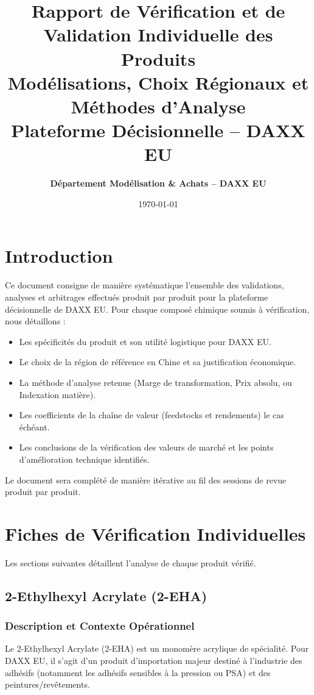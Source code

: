 \documentclass[12pt,a4paper]{article}
\title{\textbf{Rapport de Vérification et de Validation Individuelle des Produits \\ Modélisations, Choix Régionaux et Méthodes d'Analyse \\ Plateforme Décisionnelle -- DAXX EU}}
\author{\textbf{Département Modélisation \& Achats -- DAXX EU}}
\date{\today}
\begin{document}
\maketitle
\tableofcontents
\newpage

\section{Introduction}
Ce document consigne de manière systématique l'ensemble des validations, analyses et arbitrages effectués produit par produit pour la plateforme décisionnelle de DAXX EU. Pour chaque composé chimique soumis à vérification, nous détaillons :
\begin{itemize}
    \item Les spécificités du produit et son utilité logistique pour DAXX EU.
    \item Le choix de la région de référence en Chine et sa justification économique.
    \item La méthode d'analyse retenue (Marge de transformation, Prix absolu, ou Indexation matière).
    \item Les coefficients de la chaîne de valeur (feedstocks et rendements) le cas échéant.
    \item Les conclusions de la vérification des valeurs de marché et les points d'amélioration technique identifiés.
\end{itemize}

Le document sera complété de manière itérative au fil des sessions de revue produit par produit.

\newpage
\newpage
\section{Fiches de Vérification Individuelles}
Les sections suivantes détaillent l'analyse de chaque produit vérifié.

\subsection{2-Ethylhexyl Acrylate (2-EHA)}

\subsubsection{Description et Contexte Opérationnel}
Le 2-Ethylhexyl Acrylate (2-EHA) est un monomère acrylique de spécialité. Pour DAXX EU, il s'agit d'un produit d'importation majeur destiné à l'industrie des adhésifs (notamment les adhésifs sensibles à la pression ou PSA) et des peintures/revêtements.
\end{document}
